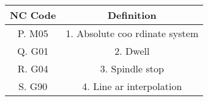                                  
\begin{tabular}{|c|c|}                                     \hline \textbf{NC Code} & \textbf{Definition} \\ \hline P. M05 & 1. Absolute coo    rdinate system \\ \hline Q. G01 & 2. Dwell \\ \hline
     R. G04 & 3. Spindle stop \\ \hline S. G90 & 4. Line    ar interpolation \\ \hline                                        
\end{tabular}                
